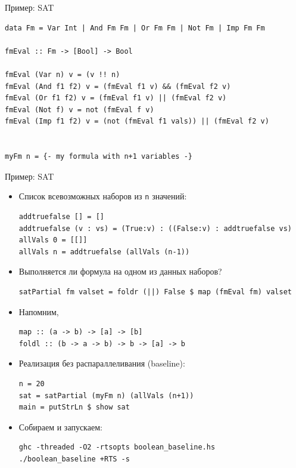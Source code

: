 \documentclass[xcolor=dvipsnames]{beamer}
\begin{document}
\begin{frame}[fragile]{Пример: SAT}
 
 \footnotesize

\begin{verbatim}
data Fm = Var Int | And Fm Fm | Or Fm Fm | Not Fm | Imp Fm Fm

fmEval :: Fm -> [Bool] -> Bool

fmEval (Var n) v = (v !! n)
fmEval (And f1 f2) v = (fmEval f1 v) && (fmEval f2 v)
fmEval (Or f1 f2) v = (fmEval f1 v) || (fmEval f2 v)
fmEval (Not f) v = not (fmEval f v)
fmEval (Imp f1 f2) v = (not (fmEval f1 vals)) || (fmEval f2 v)


myFm n = {- my formula with n+1 variables -}
\end{verbatim}

 
\end{frame}

\begin{frame}[fragile]{Пример: SAT}

\begin{itemize}[<+->]
 \item Список всевозможных наборов из {\tt n} значений:
{\footnotesize
\begin{verbatim}
addtruefalse [] = []
addtruefalse (v : vs) = (True:v) : ((False:v) : addtruefalse vs)
allVals 0 = [[]]
allVals n = addtruefalse (allVals (n-1))
\end{verbatim}

}
 \item Выполняется ли формула на одном из данных наборов?
{\footnotesize
\begin{verbatim}
satPartial fm valset = foldr (||) False $ map (fmEval fm) valset
\end{verbatim}

}
\item Напомним, 
\begin{verbatim}
map :: (a -> b) -> [a] -> [b]
foldl :: (b -> a -> b) -> b -> [a] -> b
\end{verbatim}

 \item Реализация без распараллеливания (baseline):
{\footnotesize
\begin{verbatim}
n = 20
sat = satPartial (myFm n) (allVals (n+1))
main = putStrLn $ show sat
\end{verbatim}

}
\item Собираем и запускаем:
{\footnotesize
\begin{verbatim}
ghc -threaded -O2 -rtsopts boolean_baseline.hs
./boolean_baseline +RTS -s
\end{verbatim}
}

\end{itemize}

 
\end{frame}
\end{document}
